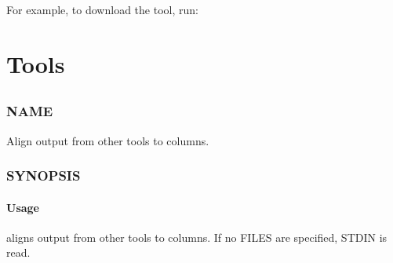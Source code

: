 \documentclass[letterpaper,10pt,english]{sphinxmanual}
\begin{document}
For example, to download the  tool, run:

\begin{sphinxVerbatim}[commandchars=\\\{\}]
 
\end{sphinxVerbatim}


\part{Tools}
\label{\detokenize{index:tools}}

\chapter{}
\label{\detokenize{mariadb-align-output:mariadb-align-output}}\label{\detokenize{mariadb-align-output::doc}}

\section{NAME}
\label{\detokenize{mariadb-align-output:name}}
 \sphinxhyphen{} Align output from other tools to columns.


\section{SYNOPSIS}
\label{\detokenize{mariadb-align-output:synopsis}}

\subsection{Usage}
\label{\detokenize{mariadb-align-output:usage}}
\begin{sphinxVerbatim}[commandchars=\\\{\}]
 \PYG{p}{[}\PYG{p}{]}
\end{sphinxVerbatim}

 aligns output from other tools to columns.  If no FILES are specified,
STDIN is read.
\end{document}
